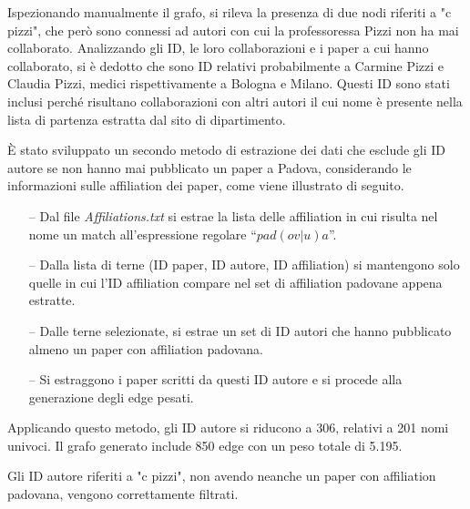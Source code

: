 \documentclass[12pt,a4paper,twoside]{report}
\begin{document}
Ispezionando manualmente il grafo, si rileva la presenza di due nodi riferiti a "c pizzi", che però
sono connessi ad autori con cui la professoressa Pizzi non ha mai collaborato. Analizzando gli ID,
le loro collaborazioni e i paper a cui hanno collaborato, si è dedotto che sono ID relativi
probabilmente a Carmine Pizzi e Claudia Pizzi, medici rispettivamente a Bologna e Milano. Questi ID
sono stati inclusi perché risultano collaborazioni con altri autori il cui nome è presente nella
lista di partenza estratta dal sito di dipartimento.

È stato sviluppato un secondo metodo di estrazione dei dati che esclude gli ID autore se non hanno
mai pubblicato un paper a Padova, considerando le informazioni sulle affiliation dei paper, come
viene illustrato di seguito.

\begin{itemize}[noitemsep, topsep=0pt]
\item[--]
Dal file \textit{Affiliations.txt} si estrae la lista delle affiliation in cui risulta nel nome un match all'espressione regolare ``$pad(ov|u)a$''.
\item[--]
Dalla lista di terne (ID paper, ID autore, ID affiliation) si mantengono solo quelle in cui l'ID affiliation compare nel set di affiliation padovane appena estratte.
\item[--]
Dalle terne selezionate, si estrae un set di ID autori che hanno pubblicato almeno un paper con affiliation padovana.
\item[--] %
Si estraggono i paper scritti da questi ID autore e si procede alla generazione degli edge pesati.
\end{itemize}

Applicando questo metodo, gli ID autore si riducono a 306, relativi a 201 nomi univoci. Il grafo
generato include 850 edge con un peso totale di 5.195.

Gli ID autore riferiti a "c pizzi", non avendo neanche un paper con affiliation padovana, vengono
correttamente filtrati.
\end{document}
